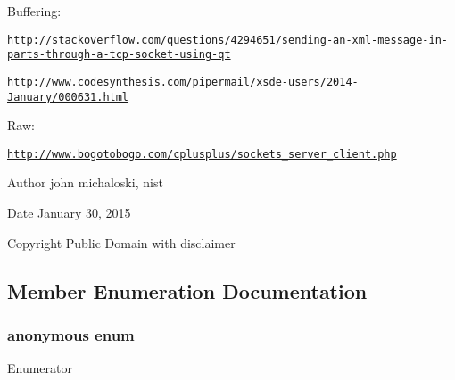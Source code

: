 Buffering\-: \par
\href{http://stackoverflow.com/questions/4294651/sending-an-xml-message-in-parts-through-a-tcp-socket-using-qt}{\tt http\-://stackoverflow.\-com/questions/4294651/sending-\/an-\/xml-\/message-\/in-\/parts-\/through-\/a-\/tcp-\/socket-\/using-\/qt} \par
\href{http://www.codesynthesis.com/pipermail/xsde-users/2014-January/000631.html}{\tt http\-://www.\-codesynthesis.\-com/pipermail/xsde-\/users/2014-\/\-January/000631.\-html} \par
Raw\-: \par
\href{http://www.bogotobogo.com/cplusplus/sockets_server_client.php}{\tt http\-://www.\-bogotobogo.\-com/cplusplus/sockets\-\_\-server\-\_\-client.\-php}

\begin{DoxyAuthor}{Author}
john michaloski, nist 
\end{DoxyAuthor}
\begin{DoxyDate}{Date}
January 30, 2015 
\end{DoxyDate}
\begin{DoxyCopyright}{Copyright}
Public Domain with disclaimer 
\end{DoxyCopyright}


\subsection{Member Enumeration Documentation}
\hypertarget{classCAsioCrclSession_a459056f275a7910eeaf4f1ce2a4d48e3}{\subsubsection[{anonymous enum}]{\setlength{\rightskip}{0pt plus 5cm}anonymous enum\hspace{0.3cm}{\ttfamily [protected]}}}\label{classCAsioCrclSession_a459056f275a7910eeaf4f1ce2a4d48e3}
\begin{Desc}
\item[Enumerator]\par
\begin{description}
\item[{\em 
\hypertarget{classCAsioCrclSession_a459056f275a7910eeaf4f1ce2a4d48e3a5e7b7a77c3bed2e03563151933b78440}{max\-\_\-length}\label{classCAsioCrclSession_a459056f275a7910eeaf4f1ce2a4d48e3a5e7b7a77c3bed2e03563151933b78440}
}]\end{description}
\end{Desc}


